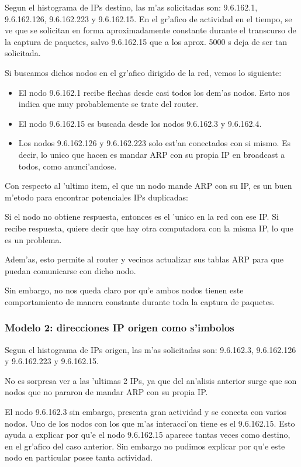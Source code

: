 \documentclass[a4paper,10pt]{article}
\begin{document}
Segun el histograma de IPs destino, las m'as solicitadas son: 9.6.162.1, 9.6.162.126, 9.6.162.223 y 9.6.162.15. En el gr'afico de actividad en el tiempo, se ve que se solicitan en forma aproximadamente constante durante el transcurso de la captura de paquetes, salvo 9.6.162.15 que a los aprox. 5000 s deja de ser tan solicitada. 

Si buscamos dichos nodos en el gr'afico dirigido de la red, vemos lo siguiente: 

\begin{itemize}
	\item El nodo 9.6.162.1 recibe flechas desde casi todos los dem'as nodos. Esto nos indica que muy probablemente se trate del router.
	\item El nodo 9.6.162.15 es buscada desde los nodos 9.6.162.3 y 9.6.162.4.
	\item Los nodos 9.6.162.126 y 9.6.162.223 solo est'an conectados con si mismo. Es decir, lo unico que hacen es mandar ARP con su propia IP en broadcast a todos, como anunci'andose.
\end{itemize}

Con respecto al 'ultimo item, el que un nodo mande ARP con su IP, es un buen m'etodo para encontrar potenciales IPs duplicadas:

Si el nodo no obtiene respuesta, entonces es el 'unico en la red con ese IP. Si recibe respuesta, quiere decir que hay otra computadora con la misma IP, lo que es un problema.

Adem'as, esto permite al router y vecinos actualizar sus tablas ARP para que puedan comunicarse con dicho nodo. 

Sin embargo, no nos queda claro por qu'e ambos nodos tienen este comportamiento de manera constante durante toda la captura de paquetes.

\subsubsection{Modelo 2: direcciones IP origen como s'imbolos}

Segun el histograma de IPs origen, las m'as solicitadas son: 9.6.162.3, 9.6.162.126 y 9.6.162.223 y 9.6.162.15.

No es sorpresa ver a las 'ultimas 2 IPs, ya que del an'alisis anterior surge que son nodos que no pararon de mandar ARP con su propia IP.

El nodo 9.6.162.3 sin embargo, presenta gran actividad y se conecta con varios nodos. Uno de los nodos con los que m'as interacci'on tiene es el 9.6.162.15. Esto ayuda a explicar por qu'e el nodo 9.6.162.15 aparece tantas veces como destino, en el gr'afico del caso anterior. Sin embargo no pudimos explicar por qu'e este nodo en particular posee tanta actividad.
\end{document}
